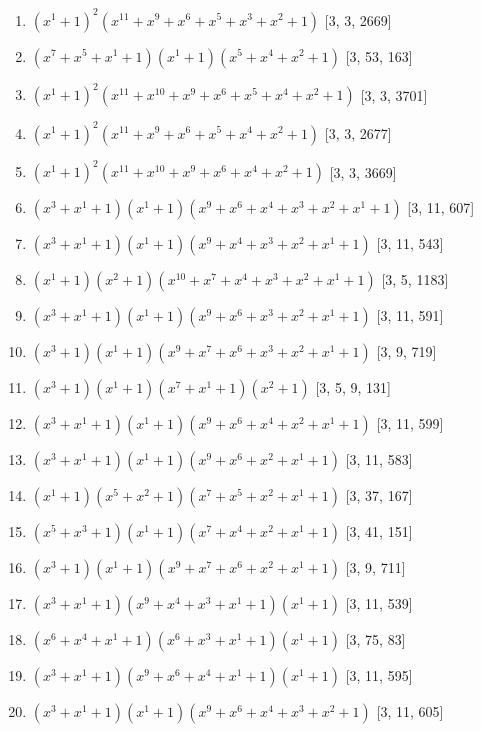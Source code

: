\documentclass[10pt,twocolumn]{article}
\begin{document}
\begin{enumerate}
\item $(x^{1} + 1)^{2}(x^{11} + x^{9} + x^{6} + x^{5} + x^{3} + x^{2} + 1)$  [3, 3, 2669]
\item $(x^{7} + x^{5} + x^{1} + 1)(x^{1} + 1)(x^{5} + x^{4} + x^{2} + 1)$  [3, 53, 163]
\item $(x^{1} + 1)^{2}(x^{11} + x^{10} + x^{9} + x^{6} + x^{5} + x^{4} + x^{2} + 1)$  [3, 3, 3701]
\item $(x^{1} + 1)^{2}(x^{11} + x^{9} + x^{6} + x^{5} + x^{4} + x^{2} + 1)$  [3, 3, 2677]
\item $(x^{1} + 1)^{2}(x^{11} + x^{10} + x^{9} + x^{6} + x^{4} + x^{2} + 1)$  [3, 3, 3669]
\item $(x^{3} + x^{1} + 1)(x^{1} + 1)(x^{9} + x^{6} + x^{4} + x^{3} + x^{2} + x^{1} + 1)$  [3, 11, 607]
\item $(x^{3} + x^{1} + 1)(x^{1} + 1)(x^{9} + x^{4} + x^{3} + x^{2} + x^{1} + 1)$  [3, 11, 543]
\item $(x^{1} + 1)(x^{2} + 1)(x^{10} + x^{7} + x^{4} + x^{3} + x^{2} + x^{1} + 1)$  [3, 5, 1183]
\item $(x^{3} + x^{1} + 1)(x^{1} + 1)(x^{9} + x^{6} + x^{3} + x^{2} + x^{1} + 1)$  [3, 11, 591]
\item $(x^{3} + 1)(x^{1} + 1)(x^{9} + x^{7} + x^{6} + x^{3} + x^{2} + x^{1} + 1)$  [3, 9, 719]
\item $(x^{3} + 1)(x^{1} + 1)(x^{7} + x^{1} + 1)(x^{2} + 1)$  [3, 5, 9, 131]
\item $(x^{3} + x^{1} + 1)(x^{1} + 1)(x^{9} + x^{6} + x^{4} + x^{2} + x^{1} + 1)$  [3, 11, 599]
\item $(x^{3} + x^{1} + 1)(x^{1} + 1)(x^{9} + x^{6} + x^{2} + x^{1} + 1)$  [3, 11, 583]
\item $(x^{1} + 1)(x^{5} + x^{2} + 1)(x^{7} + x^{5} + x^{2} + x^{1} + 1)$  [3, 37, 167]
\item $(x^{5} + x^{3} + 1)(x^{1} + 1)(x^{7} + x^{4} + x^{2} + x^{1} + 1)$  [3, 41, 151]
\item $(x^{3} + 1)(x^{1} + 1)(x^{9} + x^{7} + x^{6} + x^{2} + x^{1} + 1)$  [3, 9, 711]
\item $(x^{3} + x^{1} + 1)(x^{9} + x^{4} + x^{3} + x^{1} + 1)(x^{1} + 1)$  [3, 11, 539]
\item $(x^{6} + x^{4} + x^{1} + 1)(x^{6} + x^{3} + x^{1} + 1)(x^{1} + 1)$  [3, 75, 83]
\item $(x^{3} + x^{1} + 1)(x^{9} + x^{6} + x^{4} + x^{1} + 1)(x^{1} + 1)$  [3, 11, 595]
\item $(x^{3} + x^{1} + 1)(x^{1} + 1)(x^{9} + x^{6} + x^{4} + x^{3} + x^{2} + 1)$  [3, 11, 605]

\end{enumerate}
\end{document}
